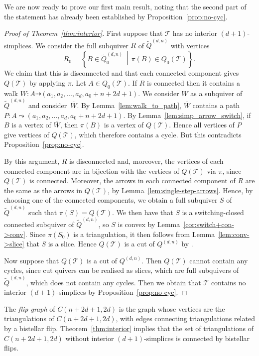 \documentclass[ALCO,Unicode,published]{cedram}
\newcommand{\walk}{\dashrightarrow}
\newcommand{\st}{\,\middle\vert\,} %
\newcommand{\set}[1]{\left\{#1\right\}} %
\newcommand{\tqdn}{\tilde{Q}^{(d, n)}}
\newcommand{\qdn}{Q^{(d, n)}}
\begin{document}
We are now ready to prove our first main result, noting that the second part of the statement has already been established by Proposition~\ref{prop:no-cyc}.

\begin{proof}[Proof of Theorem~\ref{thm:interior}]
First suppose that $\mathcal{T}$ has no interior $(d+1)$-simplices. We consider the full subquiver $R$ of $\tqdn$ with vertices \[R_{0} = \set{ B \in \tqdn_{0} \st \pi(B) \in Q_{0}(\mathcal{T})}.\] We claim that this is disconnected and that each connected component gives $Q(\mathcal{T})$ by applying $\pi$. Let $A \in Q_{0}(\mathcal{T})$. If $R$ is connected then it contains a walk $W \colon A \walk (a_{1}, a_{2}, \dots, a_{d}, a_{0} + n + 2d + 1)$. We consider $W$ as a subquiver of $\tqdn$ and consider~$\overline{W}$. By Lemma~\ref{lem:walk_to_path}, $\overline{W}$ contains a path $P \colon A \leadsto (a_{1}, a_{2}, \dots, a_{d}, a_{0} + n + 2d + 1)$. By Lemma~\ref{lem:simp_arrow_switch}, if $B$ is a vertex of $\overline{W}$, then $\pi(B)$ is a vertex of $Q(\mathcal{T})$. Hence all vertices of $P$ give vertices of $Q(\mathcal{T})$, which therefore contains a cycle. But this contradicts Proposition~\ref{prop:no-cyc}.

By this argument, $R$ is disconnected and, moreover, the vertices of each connected component are in bijection with the vertices of $Q(\mathcal{T})$ via $\pi$, since $Q(\mathcal{T})$ is connected. Moreover, the arrows in each connected component of $R$ are the same as the arrows in $Q(\mathcal{T})$, by Lemma~\ref{lem:single-step-arrows}. Hence, by choosing one of the connected components, we obtain a full subquiver $S$ of $\tqdn$ such that $\pi(S) = Q(\mathcal{T})$. We then have that $S$ is a switching-closed connected subquiver of $\tqdn$, so $S$ is convex by Lemma~\ref{cor:switch+con->conv}. Since $\pi(S_{0})$ is a triangulation, it then follows from Lemma~\ref{lem:conv->slice} that $S$ is a slice. Hence $Q(\mathcal{T})$ is a cut of $\qdn$ by \cite[Theorem 5.24]{io}.

Now suppose that $Q(\mathcal{T})$ is a cut of $\qdn$. Then $Q(\mathcal{T})$ cannot contain any cycles, since cut quivers can be realised as slices, which are full subquivers of $\tqdn$, which does not contain any cycles. Then we obtain that $\mathcal{T}$ contains no interior $(d + 1)$-simplices by Proposition~\ref{prop:no-cyc}.
\end{proof}

The \emph{flip graph} of $C(n + 2d + 1, 2d)$ is the graph whose vertices are the triangulations of $C(n + 2d + 1, 2d)$, with edges connecting triangulations related by a bistellar flip. Theorem~\ref{thm:interior} implies that the set of triangulations of $C(n + 2d + 1,2d)$ without interior $(d+1)$-simplices is connected by bistellar flips.
\end{document}
